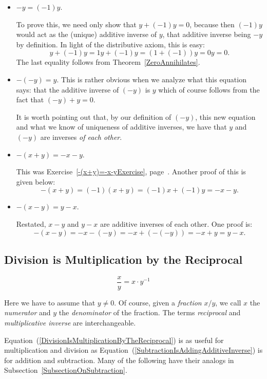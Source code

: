 \begin{itemize}
\item $-y=(-1)y$.

To prove this, we need only show that $y+(-1)y=0$, because then
$(-1)y$ would act as the (unique) additive inverse of $y$, that
additive inverse being $-y$ by definition. 
In light of the distributive axiom, this is easy:
$$y+(-1)y=1y+(-1)y=(1+(-1))y = 0y=0.$$
The last equality follows from Theorem~\ref{ZeroAnnihilates}.
\item $-(-y)=y$.  This is rather obvious when we 
analyze what this equation says: that the additive inverse of $(-y)$
is $y$ which of course follows
from the fact that $(-y)+y=0$.  

It is worth pointing out that, by our definition of $(-y)$,
this new equation and what we know of uniqueness of additive
inverses, we have that $y$ and $(-y)$ are inverses 
{\em of each other}.

\item $-(x+y)=-x-y$.

This was Exercise~\ref{-(x+y)=-x-yExercise}, 
page~\pageref{-(x+y)=-x-yExercise}. Another proof of this is given below:
$$-(x+y)=(-1)(x+y)=(-1)x+(-1)y=-x-y.$$

\item $-(x-y)=y-x$.

Restated, $x-y$ and $y-x$ are additive inverses of
each other. One proof is:
$$-(x-y)=-x-(-y)=-x+(-(-y))=-x+y=y-x.$$
	



	




\end{itemize}


\subsection{Division is Multiplication by the Reciprocal}
\begin{equation}
\frac{x}y=x\cdot y^{-1}\label{DivisionIsMultiplicationByTheReciprocal}
\end{equation}

Here we have to assume that $y\ne0$.  Of course, given a
{\it fraction} $x/y$, we call $x$ the {\it numerator}
and $y$ the {\it denominator} of the fraction. The terms
{\it reciprocal} and
{\it multiplicative inverse} are 
interchangeable.

Equation~(\ref{DivisionIsMultiplicationByTheReciprocal})
 is as useful for multiplication and division as
Equation~(\ref{SubtractionIsAddingAdditiveInverse}) is
for addition and subtraction.  Many of the following
have their analogs in Subsection~\ref{SubsectionOnSubtraction}.  

